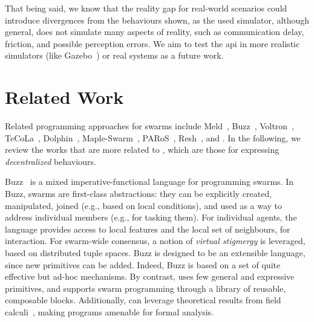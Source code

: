 That being said, we know that the reality gap for real-world scenarios could introduce divergences from the behaviours shown, as the used simulator, although general, does not simulate many aspects of reality, such as communication delay, friction, and possible perception errors. 
%
We aim to test the \ac{api} in more realistic simulators (like Gazebo~\cite{DBLP:conf/iros/KoenigH04}) or real systems as a future work.

\section{Related Work}
\label{coordination2023-macro:sec:rw}

Related programming approaches for swarms 
 include 
 Meld~\cite{Meld2007},
 Buzz~\cite{DBLP:conf/iros/PinciroliB16},
 Voltron~\cite{Mottola2014voltron},
 TeCoLa~\cite{Koutsoubelias2016tecola},
 Dolphin~\cite{lima2018dolphin},
 Maple-Swarm~\cite{DBLP:conf/isola/KosakHBWHR20}, 
 PARoS~\cite{paros},
 Resh~\cite{DBLP:conf/icra/CarrollNS21}, 
 and \cite{DBLP:conf/iros/YiDLD0WY20}.
%
%
In the following, we review the works that are more related to \MacroSwarm{},
 which are those for expressing \emph{decentralized} behaviours.
 

Buzz~\cite{DBLP:conf/iros/PinciroliB16}
 is a mixed imperative-functional language for programming swarms.
%
%
In Buzz, swarms are first-class abstractions:
 they can be explicitly created,
 manipulated,
 joined (e.g., based on local conditions),
 and used as a way to address individual members (e.g., for tasking them). %
%
For individual agents, 
 the language provides access to local features
 and the local set of neighbours, for interaction.
%
For swarm-wide consensus, 
 a notion of \emph{virtual stigmergy} is leveraged,
 based on distributed tuple spaces.
%
Buzz is designed to be an extensible language, since new primitives can be added.
%
Indeed, Buzz is based on a set of quite effective but ad-hoc mechanisms.
%
By contrast, \MacroSwarm{} uses few general and expressive primitives, 
  and supports swarm programming
  through a library of reusable, composable blocks.
%
%
Additionally, \MacroSwarm{} can leverage theoretical results from field calculi~\cite{DBLP:journals/jlap/ViroliBDACP19,DBLP:journals/tomacs/ViroliABDP18}, making programs amenable for formal analysis.


